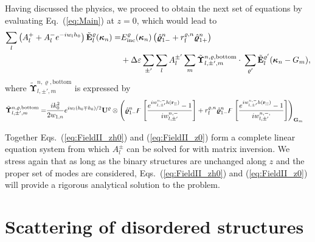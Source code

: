 \documentclass[ floatfix,reprint,amsmath,amssymb,aps,prb]{revtex4-1}
\begin{document}
\begin{widetext}
Having discussed the physics, we proceed to obtain the next set of equations by evaluating Eq.~(\ref{eq:Main}) at $z=0$, which would lead to 
\begin{align}
\sum_{l}\left(  A^+_{l}   +  A^-_{l} e^{-iw_{l}h_0}  \right) \tilde{\mathbf{E}}^{\varrho}_{l}(\boldsymbol{\kappa}_{n}) = & E_{\mathrm{inc}}^{\varrho} (\boldsymbol{\kappa}_{n}) \left( \hat{\boldsymbol{\varrho}}_{1-}^{n} + r_{\textnormal{f}}^{\varrho,n} \hat{\boldsymbol{\varrho}}_{1+}^{n} \right)   \nonumber \\ 
& + \Delta\varepsilon   \sum_{\pm'} \sum_{l} A^{\pm'}_{l} \sum_{m}  \tilde{ \boldsymbol{\Upsilon}}^{n,\varrho,\mathrm{bottom}}_{l,\pm',m} \cdot\: \sum_{\varrho'}  \tilde{\mathbf{E}}^{\varrho'}_{l}(\boldsymbol{\kappa}_{n}-G_{m}) ,\nonumber\\\label{eq:FieldII_z0}
\end{align}
where $ \tilde{ \boldsymbol{\Upsilon}}^{n,\varrho,\mathrm{bottom}}_{l,\pm',m} $ is expressed by 
\begin{align}
\tilde{ \boldsymbol{\Upsilon}}^{n,\varrho,\mathrm{bottom}}_{l,\pm',m} = &  \frac{ik_{0}^2}{2w_{1,n}} e^{iw_{l}(h_0 \mp h_0)/2} \mathbf{U}^\varrho\otimes \left( \hat{\boldsymbol{\varrho}}_{1-}^{n} \digamma\left[  \frac{ e^{iw^{n,-}_{l,\pm'} h( \mathbf{r_{||} } ) }-1}{iw^{n,-}_{l,\pm'}}\right] + r_{\textnormal{f}}^{\varrho,n} \hat{\boldsymbol{\varrho}}_{1-}^{n} \digamma\left[  \frac{ e^{iw^{n,-}_{l,\pm'} h( \mathbf{r_{||} } ) }-1}{iw^{n,-,}_{l,\pm'}}\right] \right)_{\mathbf{G}_m} 
 \label{eq:Upsilon2}
\end{align}

Together Eqs.~(\ref{eq:FieldII_zh0}) and (\ref{eq:FieldII_z0}) form a complete linear equation system from which $A^\pm_{l}$ can be solved for with matrix inversion. We stress again that as long as the binary structures are unchanged along $z$ and the proper set of modes are considered,  Eqs.~(\ref{eq:FieldII_zh0}) and (\ref{eq:FieldII_z0}) will provide a rigorous analytical solution to the problem. 

\section{Scattering of disordered structures}


\end{widetext}
\end{document}
